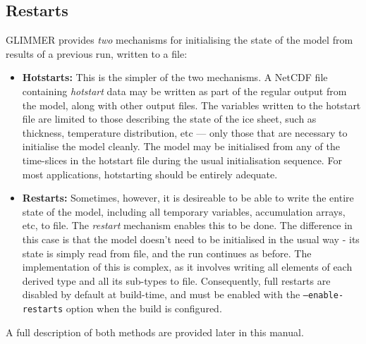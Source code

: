 \subsection{Restarts}\label{ug.sec.restarts}
%
GLIMMER provides {\it two} mechanisms for initialising the state of the model from results of a previous run, written to a file:
%
\begin{itemize}
\item {\bf Hotstarts:} This is the simpler of the two mechanisms. A NetCDF file containing \emph{hotstart} data may be written as part of the regular output from the model, along with other output files. The variables written to the hotstart file are limited to those describing the state of the ice sheet, such as thickness, temperature distribution, etc --- only those that are necessary to initialise the model cleanly. The model may be initialised from any of the time-slices in the hotstart file during the usual initialisation sequence. For most applications, hotstarting should be entirely adequate.
\item {\bf Restarts:} Sometimes, however, it is desireable to be able to write the entire state of the model, including all temporary variables, accumulation arrays, etc, to file. The \emph{restart} mechanism enables this to be done. The difference in this case is that the model doesn't need to be initialised in the usual way - its state is simply read from file, and the run continues as before. The implementation of this is complex, as it involves writing all elements of each derived type and all its sub-types to file. Consequently, full restarts are disabled by default at build-time, and must be enabled with the \texttt{--enable-restarts} option when the build is configured.
\end{itemize}
%
A full description of both methods are provided later in this manual.